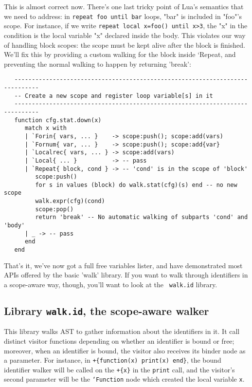 This is almost correct now. There's one last tricky point of Lua's semantics
that we need to address: in {\tt repeat foo until bar} loops, "bar" is included
in "foo"'s scope. For instance, if we write {\tt repeat local x=foo() until
  x>3}, the "x" in the condition is the local variable "x" declared inside the
body. This violates our way of handling block scopes: the scope must be kept
alive after the block is finished. We'll fix this by providing a custom walking
for the block inside `Repeat, and preventing the normal walking to happen by
returning 'break':

\begin{verbatim}
   -----------------------------------------------------------------------------
   -- Create a new scope and register loop variable[s] in it
   -----------------------------------------------------------------------------
   function cfg.stat.down(x)
      match x with
      | `Forin{ vars, ... }    -> scope:push(); scope:add(vars)
      | `Fornum{ var, ... }    -> scope:push(); scope:add{var}
      | `Localrec{ vars, ... } -> scope:add(vars)
      | `Local{ ... }          -> -- pass
      | `Repeat{ block, cond } -> -- 'cond' is in the scope of 'block'
         scope:push()
         for s in values (block) do walk.stat(cfg)(s) end -- no new scope
         walk.expr(cfg)(cond)
         scope:pop()
         return 'break' -- No automatic walking of subparts 'cond' and 'body'
      | _ -> -- pass
      end
   end
\end{verbatim}

That's it, we've now got a full free variables lister, and have demonstrated
most APIs offered by the basic 'walk' library. If you want to walk through
identifiers in a scope-aware way, though, you'll want to look at the {\tt
  walk.id} library.

\subsection{Library {\tt walk.id}, the scope-aware walker}

This library walks AST to gather information about the identifiers in it. It
call distinct visitor functions depending on whether an identifier is bound or
free; moreover, when an identifier is bound, the visitor also receives its
binder node as a parameter. For instance, in {\tt +\{function(x) print(x)
  end\}}, the bound identifier walker will be called on the \verb|+{x}| in the
\verb|print| call, and the visitor's second parameter will be the {\tt`Function}
node which created the local variable {\tt x}.

